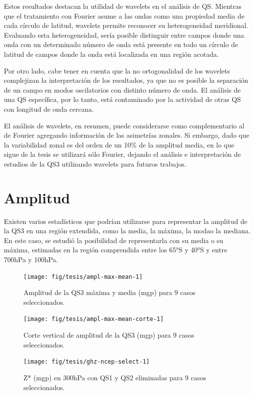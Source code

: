 \documentclass[spanish,a4paper,12pt,oneside]{book}
\begin{document}
Estos resultados destacan la utilidad de wavelets en el análisis de QS.
Mientras que el tratamiento con Fourier asume a las ondas como una
propiedad media de cada círculo de latitud, wavelets permite reconocer
su heterogeneidad meridional. Evaluando esta heterogeneidad, sería
posible distinguir entre campos donde una onda con un determinado número
de onda está presente en todo un círculo de latitud de campos donde la
onda está localizada en una región acotada.

Por otro lado, cabe tener en cuenta que la no ortogonalidad de los
wavelets complejizan la interpretación de los resultados, ya que no es
posible la separación de un campo en modos oscilatorios con distinto
número de onda. El análisis de una QS específica, por lo tanto, está
contaminado por la actividad de otras QS con longitud de onda cercana.

El análisis de wavelets, en resumen, puede considerarse como
complementario al de Fourier agregando información de las asimetrías
zonales. Si embargo, dado que la variabilidad zonal es del orden de un
10\% de la amplitud media, en lo que sigue de la tesis se utilizará sólo
Fourier, dejando el análisis e interpretación de estudios de la QS3
utilizando wavelets para futuros trabajos.

\section{Amplitud}\label{amplitud}

Existen varios estadísticos que podrían utilizarse para representar la
amplitud de la QS3 en una región extendida, como la media, la máxima, la
modao la mediana. En este caso, se estudió la posibilidad de
representarla con su media o su máxima, estimadas en la región
comprendida entre los 65°S y 40°S y entre 700hPa y 100hPa.

\begin{figure}
\texttt{[image: fig/tesis/ampl-max-mean-1]} \caption{Amplitud de la QS3 máxima y media (mgp) para 9 casos seleccionados.}\label{fig:ampl-max-mean}
\end{figure}

\begin{figure}
\texttt{[image: fig/tesis/ampl-max-mean-corte-1]} \caption{Corte vertical de amplitud de la QS3 (mgp) para 9 casos seleccionados.}\label{fig:ampl-max-mean-corte}
\end{figure}

\begin{figure}
\texttt{[image: fig/tesis/ghz-ncep-select-1]} \caption{Z* (mgp) en 300hPa con QS1 y QS2 eliminadas para 9 casos seleccionados.}\label{fig:ghz-ncep-select}
\end{figure}
\end{document}
